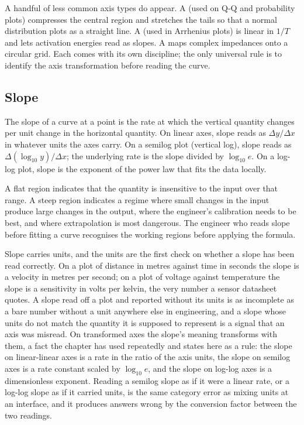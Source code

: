 A handful of less common axis types do appear. A  (used on Q-Q and probability plots) compresses the central
region and stretches the tails so that a normal distribution plots as
a straight line. A  (used in Arrhenius
plots) is linear in $1/T$ and lets activation energies read as
slopes. A  maps complex impedances onto a
circular grid. Each comes with its own discipline; the only universal
rule is to identify the axis transformation before reading the curve.

\subsection{Slope}

The slope of a curve at a point is the rate at which the vertical
quantity changes per unit change in the horizontal quantity. On
linear axes, slope reads as $\Delta y / \Delta x$ in whatever units
the axes carry. On a semilog plot (vertical log), slope reads as
$\Delta (\log_{10} y) / \Delta x$; the underlying rate is the slope
divided by $\log_{10} e$. On a log-log plot, slope is the exponent of
the power law that fits the data locally.

A flat region indicates that the quantity is insensitive to the
input over that range. A steep region indicates a regime where small
changes in the input produce large changes in the output, where the
engineer's calibration needs to be best, and where extrapolation is
most dangerous. The engineer who reads slope before fitting a curve
recognises the working regions before applying the formula.

Slope carries units, and the units are the first check on whether a
slope has been read correctly. On a plot of distance in metres against
time in seconds the slope is a velocity in metres per second; on a plot
of voltage against temperature the slope is a sensitivity in volts per
kelvin, the very number a sensor datasheet quotes. A slope read off a
plot and reported without its units is as incomplete as a bare number
without a unit anywhere else in engineering, and a slope whose units do
not match the quantity it is supposed to represent is a signal that an
axis was misread. On transformed axes the slope's meaning transforms
with them, a fact the chapter has used repeatedly and states here as a
rule: the slope on linear-linear axes is a rate in the ratio of the
axis units, the slope on semilog axes is a rate constant scaled by
$\log_{10} e$, and the slope on log-log axes is a dimensionless
exponent. Reading a semilog slope as if it were a linear rate, or a
log-log slope as if it carried units, is the same category error as
mixing units at an interface, and it produces answers wrong by the
conversion factor between the two readings.

